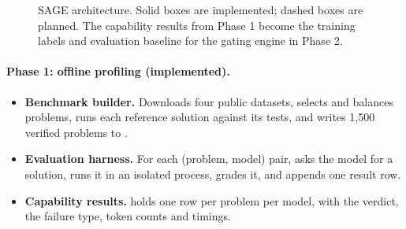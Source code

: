 \begin{figure}[htbp]
\caption{SAGE architecture. Solid boxes are implemented; dashed boxes are planned. The capability results from Phase 1 become the training labels and evaluation baseline for the gating engine in Phase 2.}
\label{fig:arch}
\end{figure}

\paragraph{Phase 1: offline profiling (implemented).}
\begin{itemize}[leftmargin=*]
  \item \textbf{Benchmark builder.} Downloads four public datasets, selects and balances problems, runs each reference solution against its tests, and writes 1,500 verified problems to .
  \item \textbf{Evaluation harness.} For each (problem, model) pair, asks the model for a solution, runs it in an isolated process, grades it, and appends one result row.
  \item \textbf{Capability results.}  holds one row per problem per model, with the verdict, the failure type, token counts and timings.
\end{itemize}

